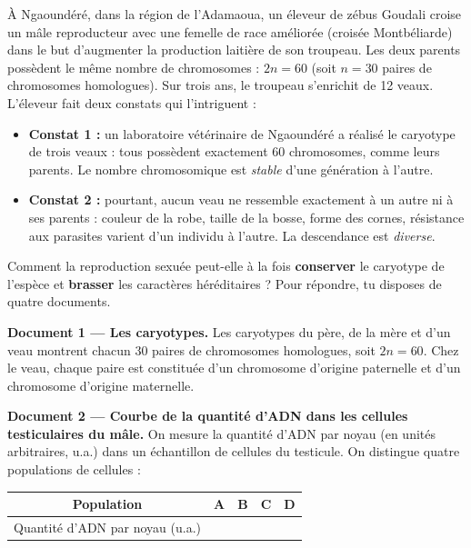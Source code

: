 \documentclass[11pt]{article}
\begin{document}
\medskip
À Ngaoundéré, dans la région de l'Adamaoua, un éleveur de zébus Goudali croise un mâle reproducteur avec une femelle de race améliorée (croisée Montbéliarde) dans le but d'augmenter la production laitière de son troupeau. Les deux parents possèdent le même nombre de chromosomes : $2n = 60$ (soit $n = 30$ paires de chromosomes homologues). Sur trois ans, le troupeau s'enrichit de 12 veaux. L'éleveur fait deux constats qui l'intriguent :

\begin{itemize}
\item \textbf{Constat 1 :} un laboratoire vétérinaire de Ngaoundéré a réalisé le caryotype de trois veaux : tous possèdent exactement 60 chromosomes, comme leurs parents. Le nombre chromosomique est \emph{stable} d'une génération à l'autre.
\item \textbf{Constat 2 :} pourtant, aucun veau ne ressemble exactement à un autre ni à ses parents : couleur de la robe, taille de la bosse, forme des cornes, résistance aux parasites varient d'un individu à l'autre. La descendance est \emph{diverse}.
\end{itemize}

Comment la reproduction sexuée peut-elle à la fois \textbf{conserver} le caryotype de l'espèce et \textbf{brasser} les caractères héréditaires ? Pour répondre, tu disposes de quatre documents.

\medskip
\textbf{Document 1 — Les caryotypes.} Les caryotypes du père, de la mère et d'un veau montrent chacun 30 paires de chromosomes homologues, soit $2n = 60$. Chez le veau, chaque paire est constituée d'un chromosome d'origine paternelle et d'un chromosome d'origine maternelle.

\medskip
\textbf{Document 2 — Courbe de la quantité d'ADN dans les cellules testiculaires du mâle.} On mesure la quantité d'ADN par noyau (en unités arbitraires, u.a.) dans un échantillon de cellules du testicule. On distingue quatre populations de cellules :

\begin{center}
\begin{tabularx}{\linewidth}{|c|>{\centering\arraybackslash}X|>{\centering\arraybackslash}X|>{\centering\arraybackslash}X|>{\centering\arraybackslash}X|}
\hline
\rowcolor{popblueL} Population & A & B & C & D \\
\hline
Quantité d'ADN par noyau (u.a.) & 2 & 4 & 2 & 1 \\
\hline
\end{tabularx}
\end{center}
\end{document}

